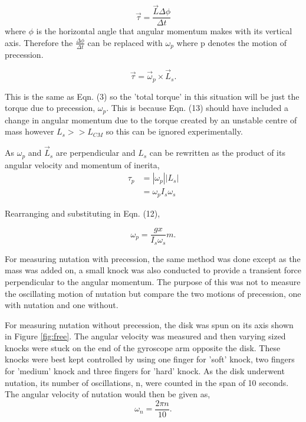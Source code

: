 \documentclass{article}
\begin{document}
\begin{equation}
    \vec{\tau} = \frac{\vec{L}\Delta \phi}{\Delta t}
\end{equation}
where $\phi$ is the horizontal angle that angular momentum makes with its vertical axis. 
Therefore the $\frac{\Delta \phi}{\Delta t}$ can be replaced with $\omega_p$ where p denotes 
the motion of precession.

\begin{equation}
    \vec{\tau} = \vec{\omega}_p \times \vec{L}_s.
\end{equation}

This is the same as Eqn. (3) so the 'total torque' in this situation will be just the 
torque due to precession, $\omega_p$. This is because Eqn. (13) should have included 
a change in angular momentum due to the torque created by an unstable centre of mass
however $L_s >> L_{CM}$ so this can be ignored experimentally. 

As $\omega_p$ and $\vec{L}_s$ are perpendicular and $L_s$ can be rewritten as the product
of its angular velocity and momentum of inerita,
\begin{equation}
    \begin{split}
    \tau_p &= |\omega_p||L_s| \\
    &= \omega_p I_s \omega_s   
    \end{split}
\end{equation} 

Rearranging and substituting in Eqn. (12),

\begin{equation}
    \omega_p = \frac{gx}{I_s\omega_s}m.
\end{equation}

For measuring nutation with precession, the same method was done except as the mass was
added on, a small knock was also conducted to provide a transient force perpendicular to
the angular momentum. The purpose of this was not to measure the oscillating motion of 
nutation but compare the two motions of precession, one with nutation and one without.

For measuring nutation without precession, the disk was spun on its axis shown in 
Figure \ref{fig:free}. The angular velocity was measured and then varying sized knocks were stuck 
on the end of the gyroscope arm opposite the disk. These knocks were best kept controlled 
by using one finger for 'soft' knock, two fingers for 'medium' knock and three fingers 
for 'hard' knock. As the disk underwent nutation, its number of oscillations, n, were counted 
in the span of 10 seconds. The angular velocity of nutation would then be given as,
\begin{equation}
    \omega_n = \frac{2\pi n}{10}.
\end{equation}
\end{document}
